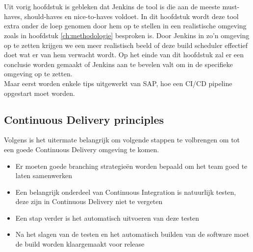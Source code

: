 
\chapter{}
\label{ch:proof-of-concept}
Uit vorig hoofdstuk is gebleken dat Jenkins de tool is die aan de meeste must-haves, should-haves en nice-to-haves voldoet. In dit hoofdstuk wordt deze tool extra onder de loep genomen door hem op te stellen in een realistische omgeving zoals in hoofdstuk \ref{ch:methodologie} besproken is. Door Jenkins in zo'n omgeving op te zetten krijgen we een meer realistisch beeld of deze build scheduler effectief doet wat er van hem verwacht wordt. Op het einde van dit hoofdstuk zal er een conclusie worden gemaakt of Jenkins aan te bevelen valt om in de specifieke omgeving op te zetten.\\
Maar eerst worden enkele tips uitgewerkt van SAP, hoe een CI/CD pipeline opgestart moet worden.

\section{Continuous Delivery principles}
\label{sec:continuous-delivery-principles}
Volgens \textcite{Riti2018} is het uitermate belangrijk om volgende stappen te volbrengen om tot een goede Continuous Delivery omgeving te komen.
\begin{itemize}
    \item Er moeten goede branching strategieën worden bepaald om het team goed te laten samenwerken
    \item Een belangrijk onderdeel van Continuous Integration is natuurlijk testen, deze zijn in Continuous Delivery niet te vergeten
    \item Een stap verder is het automatisch uitvoeren van deze testen
    \item Na het slagen van de testen en het automatisch builden van de software moet de build worden klaargemaakt voor release
\end{itemize}

